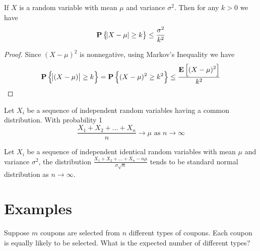 \begin{theorem}
    If $X$ is a random variable with mean $\mu$ and variance $\sigma^2$. Then for any $k > 0$ we have
    \begin{equation}
        \mathop{\bf P\/}\displaystyle \left\{\abs{X - \mu} \geq k \right\} \leq \frac{\sigma^2}{k^2}
    \end{equation}
\end{theorem}
\begin{proof}
    Since $(X - \mu)^2$ is nonnegative, using Markov's Inequality we have
    \begin{equation*}
        \mathop{\bf P\/}\displaystyle \left\{\abs{(X - \mu)} \geq k\right\} = \mathop{\bf P\/}\displaystyle \left\{(X - \mu)^2 \geq k^2\right\} \leq \frac{\mathop{\bf E\/}\displaystyle \left[ (X-\mu)^2 \right]}{k^2}
    \end{equation*}
\end{proof}

\begin{theorem}
    Let $X_i$ be a sequence of independent random variables having a common distribution. With probability 1
    \begin{equation}
        \frac{X_1 + X_2 + \dots + X_n}{n} \rightarrow \mu \text{ as } n \rightarrow \infty
    \end{equation}
\end{theorem}

\begin{theorem}
    Let $X_i$ be a sequence of independent identical random variables with mean $\mu$ and variance $\sigma^2$, the distribution $\displaystyle \frac{X_1 + X_2 + \dots + X_n - n \mu}{\sigma \sqrt{n}}$ tends to be standard normal distribution as $n \rightarrow \infty$.
\end{theorem}






\section{Examples}

\begin{example}
    Suppose $m$ coupons are selected from $n$ different types of coupons. Each coupon is equally likely to be selected. What is the expected number of different types?
\end{example}

